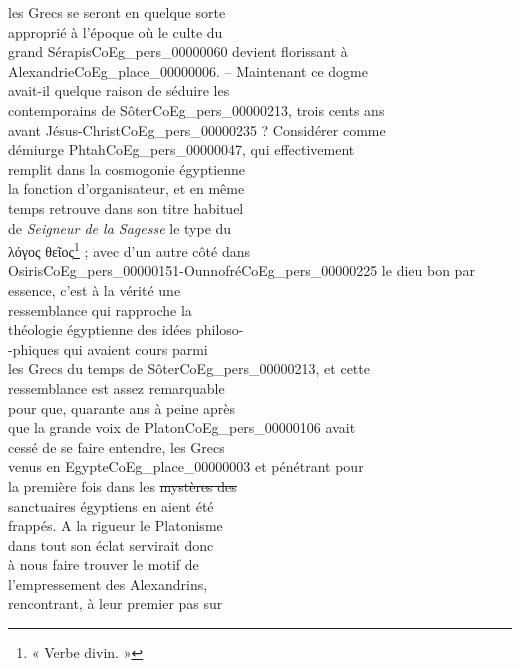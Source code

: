 \documentclass{book}
\begin{document}
{\begin{paracol}{2}
les Grecs se seront en quelque sorte\\
approprié à l’époque où le culte du\\
grand Sérapis\gls{CoEg_pers_00000060} devient florissant à\\
Alexandrie\gls{CoEg_place_00000006}. – Maintenant ce dogme\\
avait-il quelque raison de séduire les\\
contemporains de Sôter\gls{CoEg_pers_00000213}, trois cents ans\\
avant Jésus-Christ\gls{CoEg_pers_00000235} ? Considérer comme\\
démiurge Phtah\gls{CoEg_pers_00000047}, qui effectivement\\
remplit dans la cosmogonie égyptienne\\
la fonction d’organisateur, et en même\\
temps retrouve dans son titre habituel\\
de \textit{Seigneur de la Sagesse} le type du\\
λόγος θεῖος\footnote{« Verbe divin. »} ; avec d’un autre côté dans\\
Osiris\gls{CoEg_pers_00000151}-Ounnofré\gls{CoEg_pers_00000225} le dieu bon par\\
essence, c’est à la vérité une\\
ressemblance qui rapproche la\\
théologie égyptienne des idées philoso-\\
-phiques qui avaient cours parmi\\
les Grecs du temps de Sôter\gls{CoEg_pers_00000213}, et cette\\
ressemblance est assez remarquable\\
pour que, quarante ans à peine après\\
que la grande voix de Platon\gls{CoEg_pers_00000106} avait\\
cessé de se faire entendre, les Grecs\\
venus en Egypte\gls{CoEg_place_00000003} et pénétrant pour\\
la première fois dans les \sout{mystères des}\\
sanctuaires égyptiens en aient été\\
frappés. A la rigueur le Platonisme\\
dans tout son éclat servirait donc\\
à nous faire trouver le motif de\\
l’empressement des Alexandrins,\\
rencontrant, à leur premier pas sur
\end{paracol}

}
\end{document}
